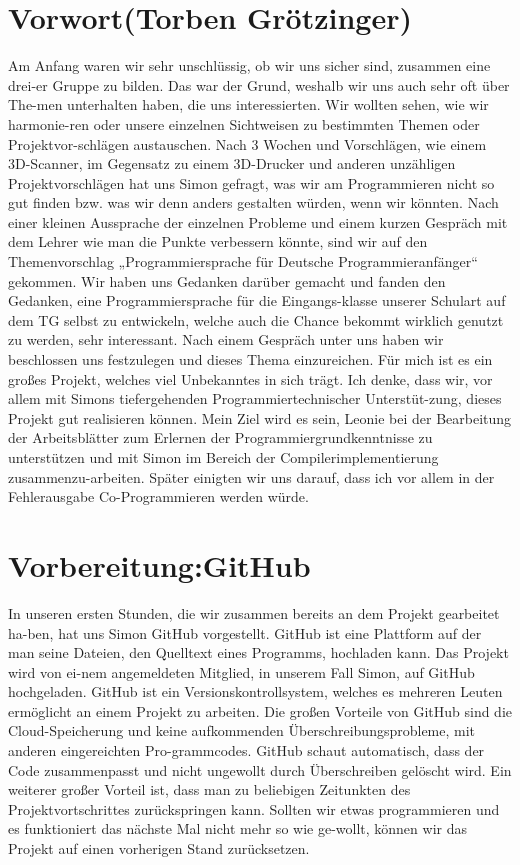 \documentclass[a4paper, 12pt]{article}
\begin{document}
\section {Vorwort(Torben Grötzinger)}
Am Anfang waren wir sehr unschlüssig, ob wir uns sicher sind, zusammen eine drei-er Gruppe zu bilden. Das war der Grund, weshalb wir uns auch sehr oft über The-men unterhalten haben, die uns interessierten. Wir wollten sehen, wie wir harmonie-ren oder unsere einzelnen Sichtweisen zu bestimmten Themen oder Projektvor-schlägen austauschen. Nach 3 Wochen und Vorschlägen, wie einem 3D-Scanner, im Gegensatz zu einem 3D-Drucker und anderen unzähligen Projektvorschlägen hat uns Simon gefragt, was wir am Programmieren nicht so gut finden bzw. was wir denn anders gestalten würden, wenn wir könnten. Nach einer kleinen Aussprache der einzelnen Probleme und einem kurzen Gespräch mit dem Lehrer wie man die Punkte verbessern könnte, sind wir auf den Themenvorschlag „Programmiersprache für Deutsche Programmieranfänger“ gekommen. Wir haben uns Gedanken darüber gemacht und fanden den Gedanken, eine Programmiersprache für die Eingangs-klasse unserer Schulart auf dem TG selbst zu entwickeln, welche auch die Chance bekommt wirklich genutzt zu werden, sehr interessant. Nach einem Gespräch unter uns haben wir beschlossen uns festzulegen und dieses Thema einzureichen. 
Für mich ist es ein großes Projekt, welches viel Unbekanntes in sich trägt. Ich denke, dass wir, vor allem mit Simons tiefergehenden Programmiertechnischer Unterstüt-zung, dieses Projekt gut realisieren können. Mein Ziel wird es sein, Leonie bei der Bearbeitung der Arbeitsblätter zum Erlernen der Programmiergrundkenntnisse zu unterstützen und mit Simon im Bereich der Compilerimplementierung zusammenzu-arbeiten. Später einigten wir uns darauf, dass ich vor allem in der Fehlerausgabe Co-Programmieren werden würde.

\section{Vorbereitung:GitHub}
In unseren ersten Stunden, die wir zusammen bereits an dem Projekt gearbeitet ha-ben, hat uns Simon GitHub vorgestellt. GitHub ist eine Plattform auf der man seine Dateien, den Quelltext eines Programms, hochladen kann. Das Projekt wird von ei-nem angemeldeten Mitglied, in unserem Fall Simon, auf GitHub hochgeladen. GitHub ist ein Versionskontrollsystem, welches es mehreren Leuten ermöglicht an einem Projekt zu arbeiten. Die großen Vorteile von GitHub sind die Cloud-Speicherung und keine aufkommenden Überschreibungsprobleme, mit anderen eingereichten Pro-grammcodes. GitHub schaut automatisch, dass der Code zusammenpasst und nicht ungewollt durch Überschreiben gelöscht wird. Ein weiterer großer Vorteil ist, dass man zu beliebigen Zeitunkten des Projektvortschrittes zurückspringen kann. Sollten wir etwas programmieren und es funktioniert das nächste Mal nicht mehr so wie ge-wollt, können wir das Projekt auf einen vorherigen Stand zurücksetzen.
\end{document}
